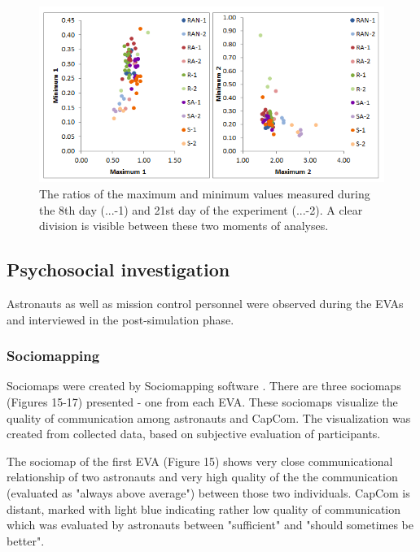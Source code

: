 \documentclass[preprint]{elsarticle}
\begin{document}
\begin{figure}
\centering
\includegraphics{img/figure14.png}
\caption{The ratios of the maximum and minimum values measured during the 8th day (...-1) and 21st day of the experiment (...-2). A clear division is visible between these two moments of analyses.}
\end{figure}

\subsection{Psychosocial investigation}
Astronauts as well as mission control personnel were observed during the EVAs and interviewed in the post-simulation phase.

\subsubsection{Sociomapping}
Sociomaps were created by Sociomapping software \cite{ref20}. There are three sociomaps (Figures 15-17) presented - one from each EVA. These sociomaps visualize the quality of communication among astronauts and CapCom. The visualization was created from collected data, based on subjective evaluation of participants.

The sociomap of the first EVA (Figure 15) shows very close communicational relationship of two astronauts and very high quality of the the communication (evaluated as "always above average") between those two individuals. CapCom is distant, marked with light blue indicating rather low quality of communication which was evaluated by astronauts between "sufficient" and "should sometimes be better".
\end{document}
